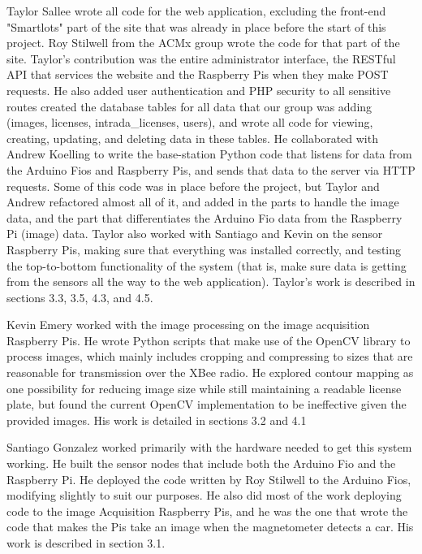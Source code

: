 \documentclass[11pt, oneside, fullpage, doublespace]{article}
\begin{document}
Taylor Sallee wrote all code for the web application, excluding the front-end "Smartlots" part of the site that was already in place before the start of this project. Roy Stilwell from the ACMx group wrote the code for that part of the site. Taylor's contribution was the entire administrator interface, the RESTful API that services the website and the Raspberry Pis when they make POST requests. He also added user authentication and PHP security to all sensitive routes created the database tables for all data that our group was adding (images, licenses, intrada\_licenses, users), and wrote all code for viewing, creating, updating, and deleting data in these tables. He collaborated with Andrew Koelling to write the base-station Python code that listens for data from the Arduino Fios and Raspberry Pis, and sends that data to the server via HTTP requests. Some of this code was in place before the project, but Taylor and Andrew refactored almost all of it, and added in the parts to handle the image data, and the part that differentiates the Arduino Fio data from the Raspberry Pi (image) data. Taylor also worked with Santiago and Kevin on the sensor Raspberry Pis, making sure that everything was installed correctly, and testing the top-to-bottom functionality of the system (that is, make sure data is getting from the sensors all the way to the web application). Taylor's work is described in sections 3.3, 3.5, 4.3, and 4.5.

Kevin Emery worked with the image processing on the image acquisition Raspberry Pis. He wrote Python scripts that make use of the OpenCV library to process images, which mainly includes cropping and compressing to sizes that are reasonable for transmission over the XBee radio. He explored contour mapping as one possibility for reducing image size while still maintaining a readable license plate, but found the current OpenCV implementation to be ineffective given the provided images. His work is detailed in sections 3.2 and 4.1

Santiago Gonzalez worked primarily with the hardware needed to get this system working. He built the sensor nodes that include both the Arduino Fio and the Raspberry Pi. He deployed the code written by Roy Stilwell to the Arduino Fios, modifying slightly to suit our purposes. He also did most of the work deploying code to the image Acquisition Raspberry Pis, and he was the one that wrote the code that makes the Pis take an image when the magnetometer detects a car. His work is described in section 3.1.
\end{document}
